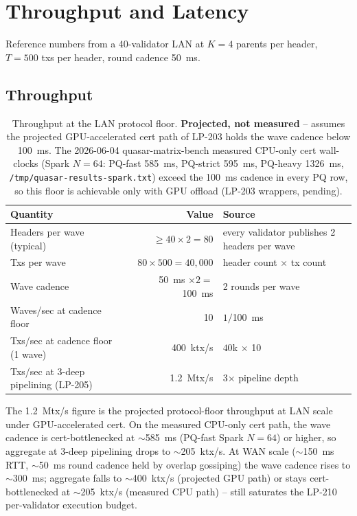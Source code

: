 \section{Throughput and Latency}

Reference numbers from a 40-validator LAN at $K{=}4$ parents per
header, $T{=}500$ txs per header, round cadence
\SI{50}{\milli\second}.

\subsection{Throughput}

\begin{table}[h]
\centering
\small
\begin{tabular}{@{}p{6cm}rl@{}}
\toprule
\textbf{Quantity} & \textbf{Value} & \textbf{Source} \\
\midrule
Headers per wave (typical) & $\geq 40 \times 2 = 80$ & every validator publishes 2 headers per wave \\
Txs per wave & $80 \times 500 = 40{,}000$ & header count $\times$ tx count \\
Wave cadence & \SI{50}{\milli\second} $\times 2 = $ \SI{100}{\milli\second} & 2 rounds per wave \\
Waves/sec at cadence floor & 10 & $1/$\SI{100}{\milli\second} \\
Txs/sec at cadence floor (1 wave) & \SI{400}{\kilo tx/s} & $40$k $\times$ 10 \\
Txs/sec at 3-deep pipelining (LP-205) & \SI{1.2}{\mega tx/s} & 3$\times$ pipeline depth \\
\bottomrule
\end{tabular}
\caption{Throughput at the LAN protocol floor. \textbf{Projected,
not measured} -- assumes the projected GPU-accelerated cert path
of LP-203 holds the wave cadence below \SI{100}{\milli\second}.
The 2026-06-04 quasar-matrix-bench measured CPU-only cert
wall-clocks (Spark $N{=}64$: PQ-fast \SI{585}{\milli\second},
PQ-strict \SI{595}{\milli\second}, PQ-heavy
\SI{1326}{\milli\second}, \texttt{/tmp/quasar-results-spark.txt})
exceed the \SI{100}{\milli\second} cadence in every PQ row, so this
floor is achievable only with GPU offload (LP-203 wrappers, pending).}
\label{tab:throughput}
\end{table}

The \SI{1.2}{\mega tx/s} figure is the projected protocol-floor
throughput at LAN scale under GPU-accelerated cert. On the measured
CPU-only cert path, the wave cadence is cert-bottlenecked at
$\sim$\SI{585}{\milli\second} (PQ-fast Spark $N{=}64$) or higher,
so aggregate at 3-deep pipelining drops to $\sim$\SI{205}{\kilo tx/s}.
At WAN scale ($\sim$\SI{150}{\milli\second} RTT,
$\sim$\SI{50}{\milli\second} round cadence held by overlap
gossiping) the wave cadence rises to $\sim$\SI{300}{\milli\second};
aggregate falls to $\sim$\SI{400}{\kilo tx/s} (projected GPU path)
or stays cert-bottlenecked at $\sim$\SI{205}{\kilo tx/s} (measured
CPU path) -- still saturates the LP-210 per-validator execution budget.

